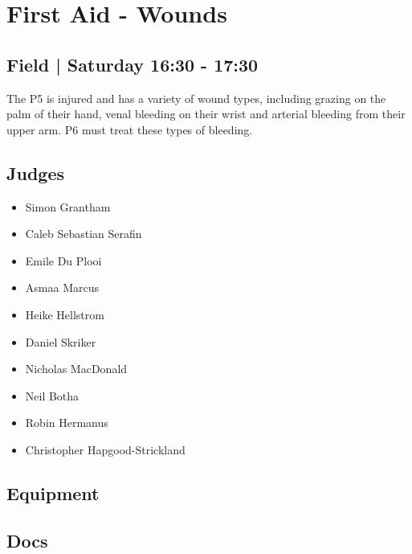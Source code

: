 \documentclass[10pt]{article}
\begin{document}
		\begin{minipage}{\linewidth}
		\setcounter{section}{15}
	\section{First Aid - Wounds }
	\subsection*{Field | Saturday 16:30 - 17:30}

	The P5 is injured and has a variety of wound types, including grazing on the palm of their hand, venal bleeding on their wrist and arterial bleeding from their upper arm. P6 must treat these types of bleeding.

	\begin{multicols}{2}
	\subsection*{\faUsers \: Judges}
	\begin{itemize}
			\item Simon Grantham
			\item Caleb Sebastian Serafin
			\item Emile Du Plooi
			\item Asmaa Marcus
			\item Heike Hellstrom
			\item Daniel Skriker
			\item Nicholas MacDonald
			\item Neil Botha
			\item Robin Hermanus
			\item Christopher Hapgood-Strickland
		\end{itemize}
	\columnbreak
	\subsection*{\faWrench \: Equipment}
	        \vfill\null
        \subsection*{\faFile \: Docs}
     	\end{multicols}


	\vspace{1cm}
	\end{minipage}
\end{document}
